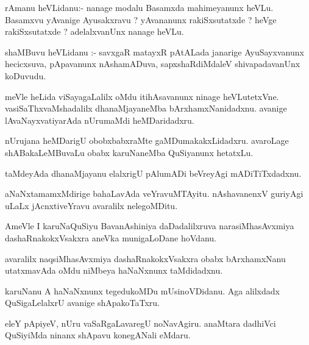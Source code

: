 \documentclass{article}
\begin{document}
\begin{mn}
rAmanu  heVLidanu:- nanage  modalu  Basamxda  mahimeyanunx  heVLu.  Basamxvu  yAvanige  Ayusakxravu ?  
yAvananunx  rakiSxsutatxde ?  heVge  rakiSxsutatxde ? adelalxvanUnx  nanage  heVLu.
\end{mn}

\begin{mn}
shaMBuvu  heVLidanu :- savxgaR  matayxR  pAtALada  janarige  AyuSayxvanunx  hecicxsuva,  pApavanunx  
nAshamADuva,  sapxshaRdiMdaleV  shivapadavanUnx  koDuvudu.
\end{mn}

\begin{mn}
meVle  heLida  viSayagaLalilx  oMdu  itihAsavanunx  ninage  heVLutetxVne.  vasiSaThxvaMshadalilx  
dhanaMjayaneMba  bArxhamxNanidadxnu.  avanige  lAvaNayxvatiyarAda  nUrumaMdi  heMDaridadxru.
\end{mn}

\begin{mn}
nUrujana  heMDarigU  obobxbabxraMte  gaMDumakakxLidadxru.  avaroLage  shABakaLeMBuvaLu  obabx  
karuNaneMba  QuSiyanunx  hetatxLu.
\end{mn}

\begin{mn}
taMdeyAda  dhanaMjayanu  elalxrigU  pAlumADi  beVreyAgi  mADiTiTxdadxnu.
\end{mn}

\begin{mn}
aNaNxtamamxMdirige  bahaLavAda  veYravuMTAyitu.  nAshavanenxV  guriyAgi  uLaLx  jAcnxtiveYravu  
avaralilx  nelegoMDitu.
\end{mn}

\begin{mn}
AmeVle  I  karuNaQuSiyu  BavanAshiniya  daDadalilxruva  narasiMhasAvxmiya  dashaRnakokxVsakxra  
aneVka  munigaLoDane  hoVdanu.
\end{mn}

\begin{mn}
avaralilx  naqsiMhasAvxmiya  dashaRnakokxVsakxra  obabx  bArxhamxNanu  utatxmavAda  oMdu  niMbeya  
haNaNxnunx  taMdidadxnu.
\end{mn}

\begin{mn}
karuNanu  A  haNaNxnunx  tegedukoMDu  mUsinoVDidanu.  Aga  alilxdadx  QuSigaLelalxrU  avanige  shApakoTaTxru.
\end{mn}

\begin{mn}
eleY  pApiyeV,  nUru  vaSaRgaLavaregU  noNavAgiru.  anaMtara  dadhiVci QuSiyiMda  ninanx  shApavu  konegANali  eMdaru.
\end{mn}
\end{document}
